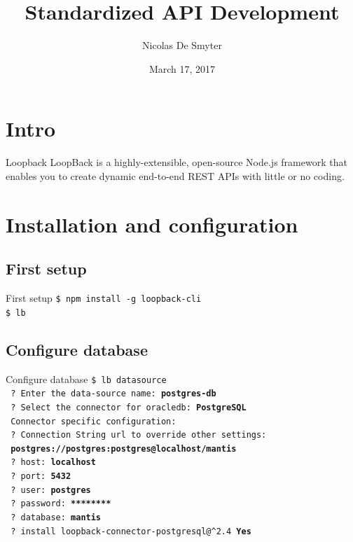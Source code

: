 \documentclass[11pt]{beamer}
\author{Nicolas De Smyter}
\title{Standardized API Development}
\institute{FDS}
\date{March 17, 2017}
\begin{document}
\begin{frame}
\titlepage
\end{frame}

\begin{frame}
\tableofcontents
\end{frame}

\section{Intro}
\begin{frame}{Loopback}
LoopBack is a highly-extensible, open-source Node.js framework that enables you to create dynamic end-to-end REST APIs with little or no coding.
\end{frame}

\section{Installation and configuration}
\subsection{First setup}
\begin{frame}{First setup}
\texttt{\$ npm install -g loopback-cli}\\
\texttt{\$ lb}
\end{frame}

\subsection{Configure database}
\begin{frame}{Configure database}
\texttt{\$ lb datasource}\\
\texttt{    ? Enter the data-source name: \textbf{postgres-db}}\\
\texttt{    ? Select the connector for oracledb: \textbf{PostgreSQL}}\\
\texttt{    Connector specific configuration:}\\
\texttt{    ? Connection String url to override other settings:}\\
\texttt{    	\textbf{postgres://postgres:postgres@localhost/mantis}}\\
\texttt{    ? host: \textbf{localhost}}\\
\texttt{    ? port: \textbf{5432}}\\
\texttt{    ? user: \textbf{postgres}}\\
\texttt{    ? password: \textbf{********}}\\
\texttt{    ? database: \textbf{mantis}}\\
\texttt{    ? install loopback-connector-postgresql@\^{}2.4 \textbf{Yes}}
\end{frame}
\end{document}
